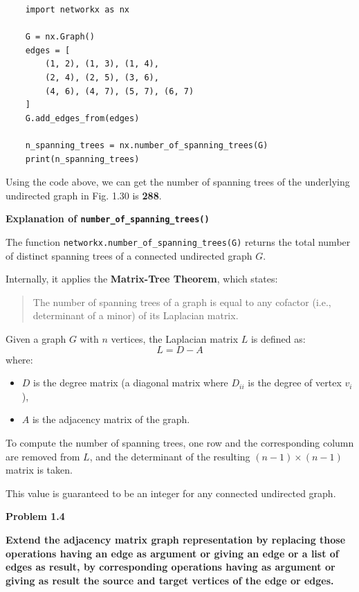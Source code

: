 \documentclass{article}
\begin{document}
\begin{verbatim}
    import networkx as nx
    
    G = nx.Graph()
    edges = [
        (1, 2), (1, 3), (1, 4),
        (2, 4), (2, 5), (3, 6),
        (4, 6), (4, 7), (5, 7), (6, 7)
    ]
    G.add_edges_from(edges)
    
    n_spanning_trees = nx.number_of_spanning_trees(G)
    print(n_spanning_trees)
\end{verbatim}

Using the code above, we can get the number of spanning trees of the underlying undirected graph in Fig. 1.30 is \textbf{288}.

\textbf{Explanation of \texttt{number\_of\_spanning\_trees()}}

The function \texttt{networkx.number\_of\_spanning\_trees(G)} returns the total number of distinct spanning trees of a connected undirected graph \( G \). 

Internally, it applies the \textbf{Matrix-Tree Theorem}, which states:

\begin{quote}
The number of spanning trees of a graph is equal to any cofactor (i.e., determinant of a minor) of its Laplacian matrix.
\end{quote}

Given a graph \( G \) with \( n \) vertices, the Laplacian matrix \( L \) is defined as:
\[
L = D - A
\]
where:
\begin{itemize}
    \item \( D \) is the degree matrix (a diagonal matrix where \( D_{ii} \) is the degree of vertex \( v_i \)),
    \item \( A \) is the adjacency matrix of the graph.
\end{itemize}

To compute the number of spanning trees, one row and the corresponding column are removed from \( L \), and the determinant of the resulting \((n-1) \times (n-1)\) matrix is taken.

This value is guaranteed to be an integer for any connected undirected graph.

\textbf{Problem 1.4}

\textbf{Extend the adjacency matrix graph representation by replacing those operations having an edge as argument or giving an edge or a list of edges as result, by corresponding operations having as argument or giving as result the source and target vertices of the edge or edges.}
\end{document}
